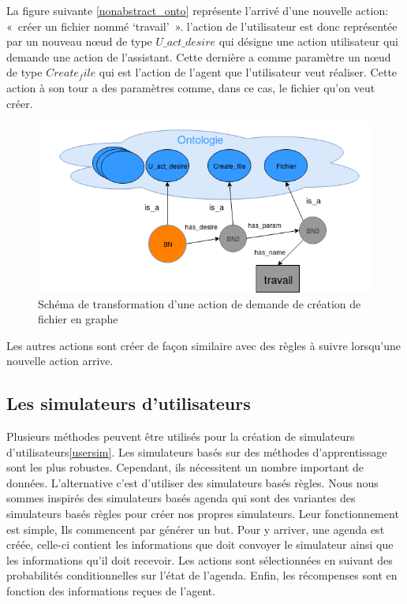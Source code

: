 La figure suivante \ref{nonabstract_onto} représente l'arrivé d'une nouvelle action: « créer un fichier nommé ‘travail' ». l'action de l'utilisateur est donc représentée par un nouveau nœud de type $U\_act\_desire$ qui désigne une action utilisateur qui demande une action de l'assistant. Cette dernière a comme paramètre un nœud de type $Create_file$ qui est l'action de l'agent que l'utilisateur veut réaliser. Cette action à son tour a des paramètres comme, dans ce cas, le fichier qu'on veut créer.
\begin{figure}[H] 
	\centering
	\includegraphics[width=0.88\linewidth]{images/Conception/DM/nonabstract_onto.png}
	\caption{Schéma de transformation d'une action de demande de création de fichier en graphe}
	
\end{figure}\label{nonabstract_onto}
Les autres actions sont créer de façon similaire avec des règles à suivre lorsqu'une nouvelle action arrive.
\subsection{Les simulateurs d'utilisateurs}
Plusieurs méthodes peuvent être utilisés pour la création de simulateurs d'utilisateurs\ref{usersim}. Les simulateurs basés sur des méthodes d'apprentissage sont les plus robustes. Cependant, ils nécessitent un nombre important de données. L'alternative c'est d'utiliser des simulateurs basés règles. Nous nous sommes inspirés des simulateurs basés agenda\cite{Schatzmann2007} qui sont des variantes des simulateurs basés règles pour créer nos propres simulateurs. Leur fonctionnement est simple, Ils commencent par générer un but. Pour y arriver, une agenda est créée, celle-ci contient les informations que doit convoyer le simulateur ainsi que les informations qu'il doit recevoir. Les actions sont sélectionnées en suivant des probabilités conditionnelles sur l'état de l'agenda. Enfin, les récompenses sont en fonction des informations reçues de l'agent.
